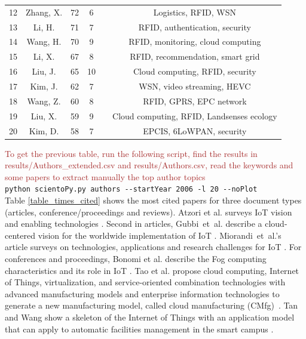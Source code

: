 \documentclass[symmetry,article,accept,moreauthors,pdftex10pt,a4paper]{mdpi}
\begin{document}
\begin{table}[H]
{\begin{tabular}{cccccc}
		12 & Zhang, X. & 72 & 6 & \cite{Yang2015161} & Logistics, RFID, WSN \\
		13 & Li, H. & 71 & 7 & \cite{Li2015} & RFID, authentication, security \\
		14 & Wang, H. & 70 & 9 & \cite{Qin2016137} & RFID, monitoring, cloud computing \\
		15 & Li, X. & 67 & 8 & \cite{Li201168} & RFID, recommendation, smart grid \\
		16 & Liu, J. & 65 & 10 & \cite{Sun20101} & Cloud computing, RFID, security \\
		17 & Kim, J. & 62 & 7 & \cite{Lim2015375} & WSN, video streaming, HEVC \\
		18 & Wang, Z. & 60 & 8 & \cite{Guo20131531} & RFID, GPRS, EPC network \\
		19 & Liu, X. & 59 & 9 & \cite{Li20131147} & Cloud computing, RFID, Landsenses ecology \\
		20 & Kim, D. & 58 & 7 & \cite{Hong201034} & EPCIS, 6LoWPAN, security \\
    	\bottomrule
	\end{tabular}}
\end{table}

\noindent
\textcolor{brown}{To get the previous table, run the following script, find the results in results/Authors\_extended.csv and results/Authors.csv, read the keywords and some papers to extract manually the top author topics}\\
\hspace*{0.5cm}\verb|python scientoPy.py authors --startYear 2006 -l 20 --noPlot|\\


Table \ref{table_times_cited} shows the most cited papers for three document types (articles, conference/proceedings and reviews). Atzori et al. surveys IoT vision and enabling technologies \cite{Atzori20102787}. Second in articles, Gubbi~et~al. describe a cloud-centered vision for the worldwide implementation of IoT \cite{Gubbi20131645}. Miorandi~et~al.'s article surveys on technologies, applications and research challenges for IoT \cite{Miorandi20121497}. 
For conferences and proceedings, Bonomi et al. describe the Fog computing characteristics and its role in IoT \cite{Bonomi201213}. Tao et al. propose cloud computing, Internet of Things, virtualization, and service-oriented combination technologies with advanced manufacturing models and enterprise information technologies to generate a new manufacturing model, called cloud manufacturing (CMfg)~\cite{Tao20111969}. Tan and Wang show a skeleton of the Internet of Things with an application model that can apply to automatic facilities management in the smart campus \cite{Tan2010}.
\end{document}
